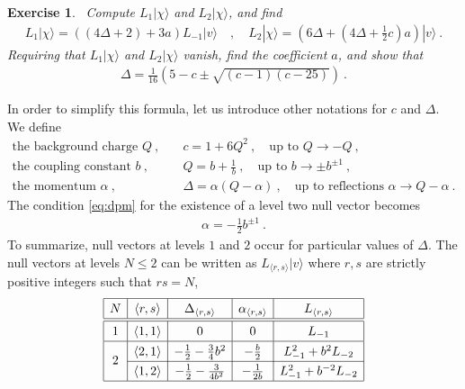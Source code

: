\documentclass[12pt, a4paper]{article}
\theoremstyle{break}
\newtheorem{exo}{Exercise}[section]
\begin{document}
\begin{exo}
 ~\label{exo:level2}
 Compute  $L_1|\chi\rangle$ and $L_2|\chi\rangle$, and find 
 \begin{align}
  L_1 |\chi\rangle = \left((4\Delta+2) + 3a\right) L_{-1}|v\rangle
  \quad , \quad L_2 |\chi\rangle= \left(6\Delta + (4\Delta +\tfrac12 c)a\right) |v\rangle\ .
 \end{align}
 Requiring that $L_1|\chi\rangle$ and $L_2|\chi\rangle$ vanish, find the coefficient $a$, and show that
 \begin{align}
 \Delta = \frac{1}{16}\left( 5-c\pm\sqrt{(c-1)(c-25)} \right) \ .
 \label{eq:dpm}
\end{align}
\end{exo}
In order to simplify this formula, let us introduce other notations for $c$ and $\Delta$. We define
\begin{align}
 \text{the background charge } Q \ , & \quad c = 1+6Q^2\ , \quad \text{up to } Q \to -Q\ ,
 \\
 \text{the coupling constant } b \ , & \quad Q = b+\frac{1}{b} \ , \quad \text{up to } b\to \pm b^{\pm 1}\ ,
 \\
 \text{the momentum } \alpha\  , &\quad \Delta = \alpha(Q-\alpha)\ , \quad \text{up to reflections } \alpha \to Q-\alpha\ .
\label{eq:refm}
 \end{align}
The condition \eqref{eq:dpm} for the existence of a level two null vector becomes 
\begin{align}
 \alpha = -\frac12 b^{\pm 1}\ .
\end{align}
To summarize, null vectors at levels $1$ and $2$ occur for particular values of $\Delta$. The null vectors at levels $N\leq 2$ can be written as $L_{\langle r,s\rangle}|v\rangle$ where $r,s$ are strictly positive integers such that $rs=N$,
\begin{align}
\renewcommand{\arraystretch}{1.3}
\begin{array}{|c|c|c|c|c|}
\hline 
N & \langle r,s\rangle & \Delta_{\langle r,s\rangle} & \alpha_{\langle r,s\rangle} & L_{\langle r,s\rangle} 
\\
\hline\hline
1 & \langle 1,1\rangle & 0 & 0 & L_{-1}
\\
\hline
\multirow{2}{*}{2} & 
\langle 2,1\rangle & -\frac12 -\frac{3}{4} b^2 & -\frac{b}{2} & L_{-1}^2 + b^2 L_{-2}
\\
\cline{2-5}
& \langle 1,2\rangle & -\frac12 - \frac{3}{4b^2} &  -\frac{1}{2b} & L_{-1}^2 + b^{-2} L_{-2} 
\\
\hline
\end{array}
\label{lot}
\end{align}
\end{document}

